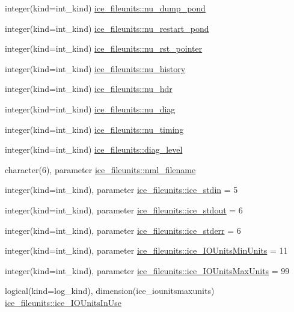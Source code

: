 \begin{DoxyCompactItemize}
integer(kind=int\_\-kind) \hyperlink{namespaceice__fileunits_a69cd946de2cd0d55f727d51f55a03052}{ice\_\-fileunits::nu\_\-dump\_\-pond}
\item 
integer(kind=int\_\-kind) \hyperlink{namespaceice__fileunits_a9eb37e0f01221f9f3d7925da1c0838c0}{ice\_\-fileunits::nu\_\-restart\_\-pond}
\item 
integer(kind=int\_\-kind) \hyperlink{namespaceice__fileunits_aef0d982897260808734543575407020b}{ice\_\-fileunits::nu\_\-rst\_\-pointer}
\item 
integer(kind=int\_\-kind) \hyperlink{namespaceice__fileunits_a5ef8e946ea55345ba52282ad21ff1d91}{ice\_\-fileunits::nu\_\-history}
\item 
integer(kind=int\_\-kind) \hyperlink{namespaceice__fileunits_ad736df9f3244eeab32a92724cef14695}{ice\_\-fileunits::nu\_\-hdr}
\item 
integer(kind=int\_\-kind) \hyperlink{namespaceice__fileunits_a5a65f292ace9ba700843f3e293922842}{ice\_\-fileunits::nu\_\-diag}
\item 
integer(kind=int\_\-kind) \hyperlink{namespaceice__fileunits_a4bd0122585694768cb4c57dd73954900}{ice\_\-fileunits::nu\_\-timing}
\item 
integer(kind=int\_\-kind) \hyperlink{namespaceice__fileunits_a65eb74a162a71d932a76d174b05903a5}{ice\_\-fileunits::diag\_\-level}
\item 
character(6), parameter \hyperlink{namespaceice__fileunits_aec528ed6b00fd0cb2d1e2c5892835bd1}{ice\_\-fileunits::nml\_\-filename}
\item 
integer(kind=int\_\-kind), parameter \hyperlink{namespaceice__fileunits_ad61888d9e876b102bb3e1c2b6653eadc}{ice\_\-fileunits::ice\_\-stdin} = 5
\item 
integer(kind=int\_\-kind), parameter \hyperlink{namespaceice__fileunits_a36939520ad7720151c3579da581946e7}{ice\_\-fileunits::ice\_\-stdout} = 6
\item 
integer(kind=int\_\-kind), parameter \hyperlink{namespaceice__fileunits_aa45e19d657680ed407b944234295c499}{ice\_\-fileunits::ice\_\-stderr} = 6
\item 
integer(kind=int\_\-kind), parameter \hyperlink{namespaceice__fileunits_a4398f02a1fc60cb19a367c3c398c3912}{ice\_\-fileunits::ice\_\-IOUnitsMinUnits} = 11
\item 
integer(kind=int\_\-kind), parameter \hyperlink{namespaceice__fileunits_a51e62a76a75cf9695476d895543860a8}{ice\_\-fileunits::ice\_\-IOUnitsMaxUnits} = 99
\item 
logical(kind=log\_\-kind), dimension(ice\_\-iounitsmaxunits) \hyperlink{namespaceice__fileunits_ac18233d112e8380d29b2a9269451ea4b}{ice\_\-fileunits::ice\_\-IOUnitsInUse}
\end{DoxyCompactItemize}

